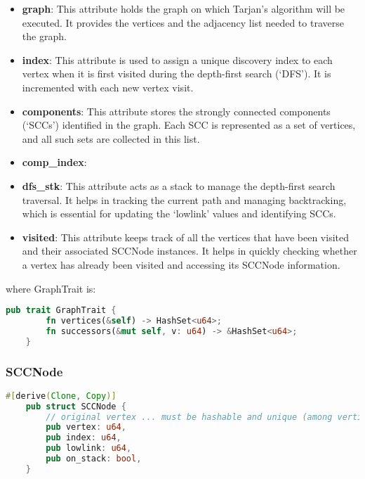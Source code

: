 \begin{itemize}
    \item \textbf{graph}: This attribute holds the graph on which Tarjan's algorithm will be executed.
    It provides the vertices and the adjacency list needed to traverse the graph.
    \item \textbf{index}: This attribute is used to assign a unique discovery index to each vertex when it is first visited during the depth-first search (`DFS').
    It is incremented with each new vertex visit.
    \item \textbf{components}: This attribute stores the strongly connected components (`SCCs') identified in the graph.
    Each SCC is represented as a set of vertices, and all such sets are collected in this list.
    \item \textbf{comp\_index}:
    \item \textbf{dfs\_stk}: This attribute acts as a stack to manage the depth-first search traversal.
    It helps in tracking the current path and managing backtracking, which is essential for updating the `lowlink' values and identifying SCCs.
    \item \textbf{visited}: This attribute keeps track of all the vertices that have been visited and their associated SCCNode instances.
    It helps in quickly checking whether a vertex has already been visited and accessing its SCCNode information.
\end{itemize}

where GraphTrait is:

\begin{lstlisting}[language=Rust, style=rust, caption={Defining GraphTrait}, label={lst:rust-define-graphtrait}, firstnumber=1]
    pub trait GraphTrait {
        fn vertices(&self) -> HashSet<u64>;
        fn successors(&mut self, v: u64) -> &HashSet<u64>;
    }
\end{lstlisting}

\subsubsection{SCCNode}

\begin{lstlisting}[language=Rust, style=rust, caption={Defining the SCCNode}, label={lst:rust-define-sccnode}, firstnumber=1]
    #[derive(Clone, Copy)]
    pub struct SCCNode {
        // original vertex ... must be hashable and unique (among vertices)
        pub vertex: u64,
        pub index: u64,
        pub lowlink: u64,
        pub on_stack: bool,
    }
\end{lstlisting}

